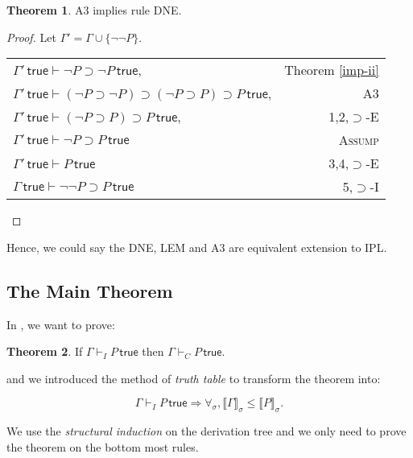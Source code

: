 \documentclass{article}
\newcounter{rowcount}
\theoremstyle{definition}
\newtheorem{theorem}{Theorem}[section]
\newcommand{\true}{\,\textsf{true}}
\newcommand{\brs}[1]{\llbracket#1\rrbracket_\sigma}
\begin{document}
\setcounter{rowcount}{0}
\begin{theorem}
    A3 implies rule DNE.
\end{theorem}
\begin{proof}
    Let $\Gamma' = \Gamma \cup \{\neg\neg P\}$.

    \begin{tabular}{@{\stepcounter{rowcount}\therowcount. }lr}
        $\Gamma' \true \vdash \neg P \supset \neg P\true$,                                        & Theorem \ref{imp-ii} \\
        $\Gamma' \true \vdash (\neg P \supset \neg P) \supset (\neg P \supset P)\supset P\true $, & A3                   \\
        $\Gamma' \true \vdash (\neg P \supset P)\supset P\true $,                                 & 1,2,$\supset$-E      \\
        $\Gamma' \true \vdash \neg P\supset P \true$                                              & \textsc{Assump}      \\
        $\Gamma' \true \vdash P \true$                                                            & 3,4,$\supset$-E      \\
        $\Gamma \true \vdash \neg\neg P \supset P \true$                                          & 5,$\supset$-I        \\
    \end{tabular}
\end{proof}

Hence, we could say the DNE, LEM and A3 are equivalent extension to IPL.

\subsection{The Main Theorem}

In \cite{int}, we want to prove:

\begin{theorem}
    If $\Gamma \vdash_{I} P \true$ then $\Gamma \vdash_{C} P \true$.
\end{theorem}

and we introduced the method of \emph{truth table} to transform the theorem into:

\[
    \Gamma \vdash_{I} P \true \Rightarrow \forall_\sigma, \brs{\Gamma} \leq \brs{P}.
\]

We use the \emph{structural induction} on the derivation tree and we only need to prove the theorem on the bottom most rules.
\end{document}
